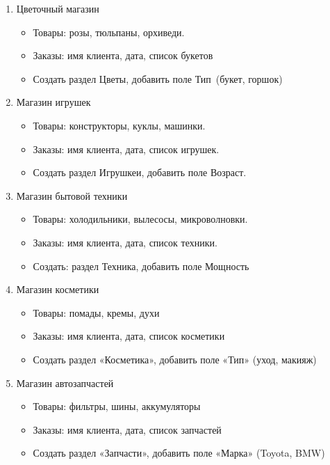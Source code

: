 \documentclass[12pt]{article}
\begin{document}
\begin{enumerate}
	\item Цветочный магазин
	      \begin{itemize}
		      \item Товары: розы, тюльпаны, орхиведи.
		      \item Заказы: имя клиента, дата, список букетов
		      \item Создать раздел \guillemotleft Цветы\guillemotright , добавить поле \guillemotleft Тип\guillemotright \ (букет, горшок)
	      \end{itemize}

	      \newpage

	\item Магазин игрушек
	      \begin{itemize}
		      \item Товары: конструкторы, куклы, машинки.
		      \item Заказы: имя клиента, дата, список игрушек.
		      \item Создать раздел \guillemotleft Игрушкеи\guillemotright, добавить поле \guillemotleft Возраст\guillemotright.
	      \end{itemize}

	\item Магазин бытовой техники
	      \begin{itemize}
		      \item Товары: холодильники, вылесосы, микроволновки.
		      \item Заказы: имя клиента, дата, список техники.
		      \item Создать: раздел \guillemotleft Техника\guillemotright, добавить поле \guillemotleft Мощность\guillemotright
	      \end{itemize}

	\item Магазин косметики
	      \begin{itemize}
		      \item Товары: помады, кремы, духи
		      \item Заказы: имя клиента, дата, список косметики
		      \item Создать раздел «Косметика», добавить поле «Тип» (уход, макияж)
	      \end{itemize}

	\item Магазин автозапчастей
	      \begin{itemize}
		      \item Товары: фильтры, шины, аккумуляторы
		      \item Заказы: имя клиента, дата, список запчастей
		      \item Создать раздел «Запчасти», добавить поле «Марка» (Toyota, BMW)
	      \end{itemize}


\end{enumerate}
\end{document}
